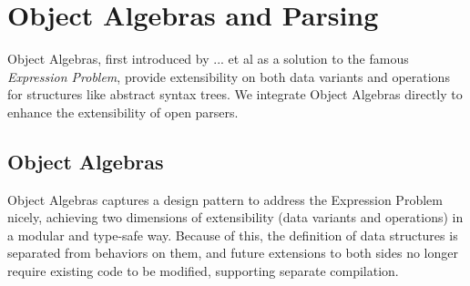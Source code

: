 \section{Object Algebras and Parsing}\label{sec:algebrasandparsing}

Object Algebras, first introduced by ... et al as a solution to the famous \textit{Expression Problem}, provide extensibility on
both data variants and operations for structures like abstract syntax trees. We integrate Object Algebras directly to enhance the
extensibility of open parsers.

\subsection{Object Algebras}\label{sec:objectalgebras}
Object Algebras captures a design pattern to address the Expression Problem nicely,
achieving two dimensions of extensibility (data variants and operations) in a modular and type-safe way.
Because of this, the definition of data structures is separated from behaviors on them, and future extensions
to both sides no longer require existing code to be modified, supporting separate compilation.

